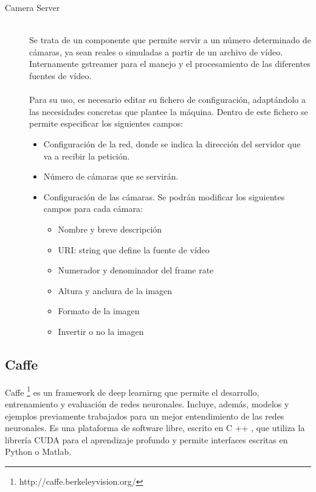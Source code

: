 \begin{description}
\item[Camera Server] \hfill 
\vspace{10pt}
\\
Se trata de un componente que permite servir a un número determinado de cámaras, ya sean reales o simuladas a partir de un archivo de vídeo. Internamente gstreamer para el manejo y el procesamiento de las diferentes fuentes de vídeo.\\
\vspace{-10pt}
\\
Para su uso, es necesario editar su fichero de configuración, adaptándolo a las necesidades concretas que plantee la máquina. Dentro de este fichero se permite especificar los siguientes campos:\\
\vspace{-20pt}
\begin{itemize}
    \item Configuración de la red, donde se indica la dirección del servidor que va a recibir la petición.
    \item Número de cámaras que se servirán.
    \item Configuración de las cámaras. Se podrán modificar los siguientes campos para cada cámara:
    \begin{itemize}
         \item Nombre y breve descripción
         \item URI: string que define la fuente de vídeo
     	 \item Numerador y denominador del frame rate
         \item Altura y anchura de la imagen
         \item Formato de la imagen
         \item Invertir o no la imagen 
    \end{itemize}
\end{itemize}
\end{description}

\subsection{Caffe}
Caffe \footnote{http://caffe.berkeleyvision.org/} es un framework de deep learnirng que permite el desarrollo, entrenamiento y evaluación de redes neuronales. Incluye, además, modelos y ejemplos previamente trabajados para un mejor entendimiento de las redes neuronales. Es una plataforma de software libre, escrito en C ++ ,  que utiliza la librería CUDA para el aprendizaje profundo y permite interfaces escritas en Python o Matlab.\\ 

